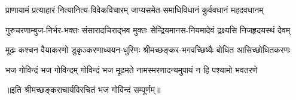 \begin{large}
\begin{multicols}{2}
\begin{flushleft}
\fourlineindentedshloka
{प्राणायामं प्रत्याहारं}
{नित्यानित्य-विवेकविचारम्}
{जाप्यसमेत-समाधिविधानं}
{कुर्ववधानं महदवधानम्}

\fourlineindentedshloka
{गुरुचरणाम्बुज-निर्भर-भक्तः}
{संसारादचिराद्भव मुक्तः}
{सेन्द्रियमानस-नियमादेवं}
{द्रक्ष्यसि निजहृदयस्थं देवम्}

\fourlineindentedshloka
{मूढः कश्चन वैयाकरणो}
{डुकृञ्करणाध्ययन-धुरिणः}
{श्रीमच्छङ्कर-भगवच्छिष्यैः}
{बोधित आसिच्छोधितकरणः}

\fourlineindentedshloka
{भज गोविन्दं भज गोविन्दम्}
{गोविन्दं भज मूढमते}
{नामस्मरणादन्यमुपायं}
{न हि पश्यामो भवतरणे}

\fourlineshloka{}{}{}{}
\fourlineshloka{}{}{}{}
\end{flushleft}
\end{multicols}
॥इति श्रीमच्छङ्कराचार्यविरचितं भज गोविन्दं सम्पूर्णम्॥
\end{large}
\setlength{\shlokaspaceskip}{24pt}
\setlength{\columnseprule}{1pt}
\setlength{\columnsep}{30pt}